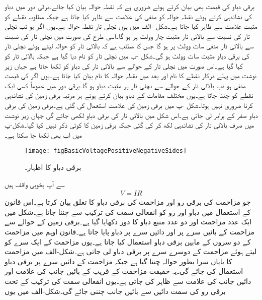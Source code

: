 برقی دباو کی قیمت بھی بیان کرتے ہوئے ضروری ہے کہ نقطہ حوالہ بیان کیا جائے۔برقی دور میں دباو کی نشاندہی کرتے ہوئے نقطہ حوالہ کو منفی کی علامت  سے ظاہر کیا جاتا ہے جبکہ مطلوبہ نقطے کو مثبت علامت  سے ظاہر کیا جاتا ہے۔شکل -الف میں یوں نچلی تار نقطہ حوالہ ہے۔یوں اگر  ہو تب نچلی تار کی نسبت سے بالائی تار مثبت چار وولٹ پر ہو گا۔اسی طرح  کی صورت میں نچلی تار کی نسبت سے بالائی تار منفی سات وولٹ پر ہو گا جس کا مطلب ہے کہ بالائی تار کو حوالہ لیتے ہوئے نچلی تار کی برقی دباو مثبت سات وولٹ ہو گی۔شکل  -ب میں نچلی تار کو  نام دیا گیا ہے جبکہ بالائی تار کو  کہا گیا ہے۔اس صورت میں نچلی تار کے حوالے سے بالائی تار کی دباو کو  لکھا جاتا ہے جہاں زیر نوشت میں پہلے درکار نقطے کا نام اور بعد میں نقطہ حوالہ کا نام بیان کیا جاتا ہے۔یوں اگر  کی قیمت منفی ہو تب بالائی تار کے حوالے سے نچلی تار پر مثبت دباو ہو گا۔برقی دور میں عموماً کسی ایک نقطے کو  چننا جاتا ہے۔یوں مختلف مقامات کے دباو بیان کرتے ہوئے ہر مرتبہ برقی زمین کی نشاندہی کرنا ضروری نہیں ہوتا۔شکل -پ میں برقی زمین کی علامت استعمال کی گئی ہے۔برقی زمین کی برقی دباو صفر کے برابر لی جاتی ہے۔اس شکل میں بالائی تار کی برقی دباو  لکھی جائے گی جہاں زیر نوشت میں صرف بالائی تار کی نشاندہی  لکھ کر کی گئی جبکہ برقی زمین کا کوئی ذکر نہیں کیا گیا۔شکل-پ میں اب بھی  لکھا جا سکتا ہے۔
\begin{figure}
\centering
\texttt{[image: figBasicVoltagePositiveNegativeSides]}
\caption{برقی دباو کا اظہار۔}
\label{شکل_بنیادی_دباو_کا_اظہار}
\end{figure}
%
 سے آپ بخوبی واقف ہیں
\begin{align}
V=I R
\end{align}
جو مزاحمت کی برقی رو اور مزاحمت کی برقی دباو کا تعلق بیان کرتا ہے۔اس قانون کے استعمال میں دباو  اور رو  کو انفعالی سمت کی ترکیب سے چننا جاتا ہے۔شکل  میں ایک عدد مزاحمت اور دو عدد منبع دباو کا دور دکھایا گیا ہے۔برقی زمین کے حوالے سے مزاحمت کے بائیں سرے پر  اور دائیں سرے پر  دباو پایا جاتا ہے۔قانون اوہم میں مزاحمت کے دو سروں کے مابین برقی دباو استعمال کیا جاتا ہے۔یوں مزاحمت کے ایک سرے کو  لیتے ہوئے مزاحمت کے دوسرے سرے پر برقی دباو لی جاتی ہے۔شکل-الف میں مزاحمت کا بایاں سرا بطور حوالہ چننا گیا ہے جبکہ مزاحمت کے دائیں سرے پر برقی دباو استعمال کی جائے گی۔یہ حقیقت مزاحمت کے قریب  کے بائیں جانب  کی علامت اور دائیں جانب   کی علامت سے ظاہر کی جاتی ہے۔یوں انفعالی سمت کی ترکیب کے تحت برقی رو کی سمت دائیں سے بائیں جانب چننی جائے گی۔شکل-الف میں یوں
